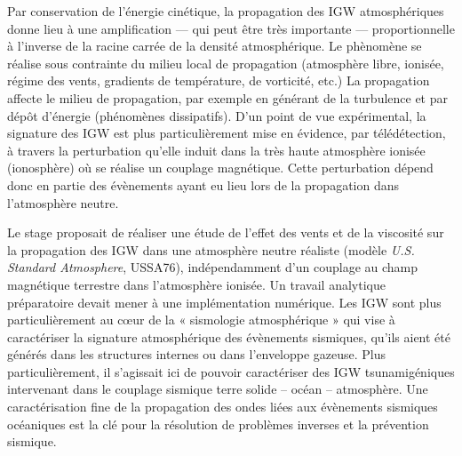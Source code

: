 Par conservation de l'énergie cinétique, la propagation des IGW atmosphériques donne lieu à une amplification — qui peut être très importante — proportionnelle à l'inverse de la racine carrée de la densité atmosphérique. Le phènomène se réalise sous contrainte du milieu local de propagation (atmosphère libre, ionisée, régime des vents, gradients de température, de vorticité, etc.) La propagation affecte le milieu de propagation, par exemple en générant de la turbulence et par dépôt d'énergie (phénomènes dissipatifs). D'un point de vue expérimental, la signature des IGW est plus particulièrement mise en évidence, par télédétection, à travers la perturbation qu'elle induit dans la très haute atmosphère ionisée (ionosphère) où se réalise un couplage magnétique. Cette perturbation dépend donc en partie des évènements ayant eu lieu lors de la propagation dans l'atmosphère neutre.

Le stage proposait de réaliser une étude de l'effet des vents et de la viscosité sur la propagation des IGW dans une atmosphère neutre réaliste (modèle \emph{U.S. Standard Atmosphere}, USSA76), indépendamment d'un couplage au champ magnétique terrestre dans l'atmosphère ionisée. Un travail analytique préparatoire devait mener à une implémentation numérique. Les IGW sont plus particulièrement au cœur de la « sismologie atmosphérique » qui vise à caractériser la signature atmosphérique des évènements sismiques, qu'ils aient été générés dans les structures internes ou dans l'enveloppe gazeuse. Plus particulièrement, il s'agissait ici de pouvoir caractériser des IGW tsunamigéniques intervenant dans le couplage sismique terre solide -- océan -- atmosphère. Une caractérisation fine de la propagation des ondes liées aux évènements sismiques océaniques est la clé pour la résolution de problèmes inverses et la prévention sismique.



